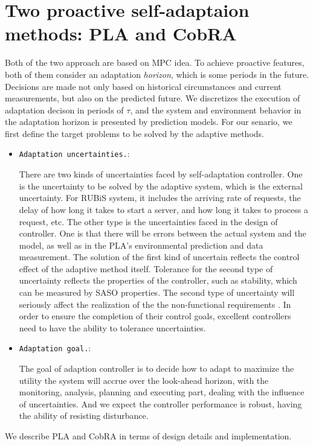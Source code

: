 \documentclass[sigconf]{acmart}
\begin{document}
\section{Two proactive self-adaptaion methods: PLA and CobRA}
Both of the two approach are based on MPC\cite{mpc} idea. To achieve proactive features, both of them consider an adaptation \textit{horizon}, which is some periods in the future. Decisions are made not only based on historical circumstances and current measurements, but also on the predicted future. We discretizes the execution of adaptation decison in periods of $\tau$, and the system and environment behavior in the adaptation horizon is presented by prediction models. For our senario, we first define the target problems to be solved by the adaptive methods. 
\begin{itemize}
	\item {\verb|Adaptation uncertainties.|}:
	
	There are two kinds of uncertainties faced by self-adaptation controller. One is the uncertainty to be solved by the adaptive system, which is the external uncertainty. For RUBiS system, it includes the arriving rate of requests, the delay of how long it takes to start a server, and how long it takes to process a request, etc. The other type is the uncertainties faced in the design of controller. One is that there will be errors between the actual system and the model, as well as in the PLA's environmental prediction and data measurement.
	The solution of the first kind of uncertain reflects the control effect of the adaptive method itself.
	Tolerance for the second type of uncertainty reflects the properties of the controller, such as stability, which can be measured by SASO properties\cite{saso}.
	The second type of uncertainty will seriously affect the realization of the the non-functional requirements . In order to ensure the completion of their control goals, excellent controllers need to have the ability to tolerance uncertainties.
	\item {\verb|Adaptation goal.|}:
	
	The goal of adaption controller is to decide how to adapt to maximize the utility the system will accrue over the look-ahead horizon, with the monitoring, analysis, planning and executing part, dealing with the influence of uncertainties. And we expect the controller performance is robust, having the ability of resisting disturbance.
\end{itemize}
We describe PLA and CobRA in terms of design details and implementation.
\end{document}

